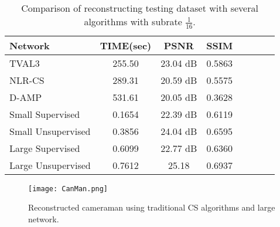 
\begin{table}[!htb]
\caption[Average time and quality metrics for testing dataset]{Comparison of reconstructing testing dataset with several algorithms with subrate $\frac{1}{16}$.}
\label{tab:summaryComp}
\begin{center}
\begin{tabular}{l*{6}{c}r}
Network              & TIME(sec) & PSNR & SSIM \\
\hline
TVAL3 & 255.50 & 23.04 dB & 0.5863\\
NLR-CS & 289.31 & 20.59 dB & 0.5575\\
D-AMP & 531.61 & 20.05 dB & 0.3628\\
Small Supervised   & 0.1654 & 22.39 dB & 0.6119\\
Small Unsupervised     & 0.3856 & 24.04 dB & 0.6595\\
Large Supervised & 0.6099 & 22.77 dB & 0.6360 \\
Large Unsupervised & 0.7612 & 25.18 & 0.6937\\
\bottomrule 
\end{tabular}%
\end{center}  
\end{table}

\begin{figure}[!htb] 
\centering 
\texttt{[image: CanMan.png]}
\caption[Reconstructed cameraman with traditional methods]{Reconstructed cameraman using traditional CS algorithms and large network.}
\label{fig:Canman1} 
\end{figure} 

